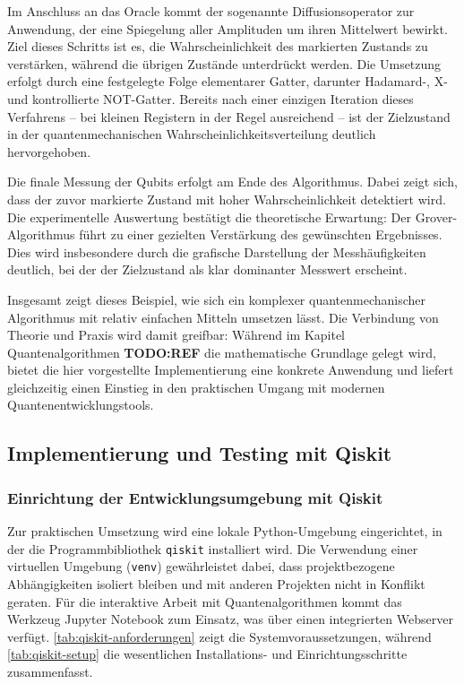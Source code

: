 Im Anschluss an das Oracle kommt der sogenannte Diffusionsoperator zur Anwendung, der eine Spiegelung aller Amplituden um ihren Mittelwert bewirkt. Ziel dieses Schritts ist es, die Wahrscheinlichkeit des markierten Zustands zu verstärken, während die übrigen Zustände unterdrückt werden. Die Umsetzung erfolgt durch eine festgelegte Folge elementarer Gatter, darunter Hadamard-, X- und kontrollierte NOT-Gatter. Bereits nach einer einzigen Iteration dieses Verfahrens – bei kleinen Registern in der Regel ausreichend – ist der Zielzustand in der quantenmechanischen Wahrscheinlichkeitsverteilung deutlich hervorgehoben.

Die finale Messung der Qubits erfolgt am Ende des Algorithmus. Dabei zeigt sich, dass der zuvor markierte Zustand mit hoher Wahrscheinlichkeit detektiert wird. Die experimentelle Auswertung bestätigt die theoretische Erwartung: Der Grover-Algorithmus führt zu einer gezielten Verstärkung des gewünschten Ergebnisses. Dies wird insbesondere durch die grafische Darstellung der Messhäufigkeiten deutlich, bei der der Zielzustand als klar dominanter Messwert erscheint.

Insgesamt zeigt dieses Beispiel, wie sich ein komplexer quantenmechanischer Algorithmus mit relativ einfachen Mitteln umsetzen lässt. Die Verbindung von Theorie und Praxis wird damit greifbar: Während im Kapitel Quantenalgorithmen \textbf{TODO:REF} die mathematische Grundlage gelegt wird, bietet die hier vorgestellte Implementierung eine konkrete Anwendung und liefert gleichzeitig einen Einstieg in den praktischen Umgang mit modernen Quantenentwicklungstools.

\subsection{Implementierung und Testing mit Qiskit}
\subsubsection{Einrichtung der Entwicklungsumgebung mit Qiskit}

Zur praktischen Umsetzung wird eine lokale Python-Umgebung eingerichtet, in der die Programmbibliothek \texttt{qiskit} installiert wird. Die Verwendung einer virtuellen Umgebung (\texttt{venv}) gewährleistet dabei, dass projektbezogene Abhängigkeiten isoliert bleiben und mit anderen Projekten nicht in Konflikt geraten. Für die interaktive Arbeit mit Quantenalgorithmen kommt das Werkzeug Jupyter Notebook zum Einsatz, was über einen integrierten Webserver verfügt. \autoref{tab:qiskit-anforderungen} zeigt die Systemvoraussetzungen, während \autoref{tab:qiskit-setup} die wesentlichen Installations- und Einrichtungsschritte zusammenfasst.

